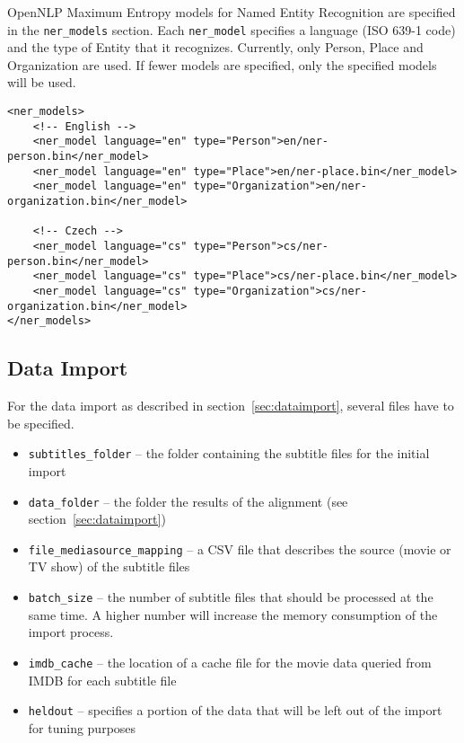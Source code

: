 OpenNLP Maximum Entropy models for Named Entity Recognition are specified in the \verb#ner_models# section. Each \verb#ner_model# specifies a language (ISO 639-1 code) and the type of Entity that it recognizes. Currently, only Person, Place and Organization are used. If fewer models are specified, only the specified models will be used.

\begin{lstlisting}
<ner_models>
    <!-- English -->
    <ner_model language="en" type="Person">en/ner-person.bin</ner_model>
    <ner_model language="en" type="Place">en/ner-place.bin</ner_model>
    <ner_model language="en" type="Organization">en/ner-organization.bin</ner_model>

    <!-- Czech -->
    <ner_model language="cs" type="Person">cs/ner-person.bin</ner_model>
    <ner_model language="cs" type="Place">cs/ner-place.bin</ner_model>
    <ner_model language="cs" type="Organization">cs/ner-organization.bin</ner_model>
</ner_models>
\end{lstlisting}

\subsection{Data Import}
For the data import as described in section~\ref{sec:dataimport}, several files have to be specified.

\begin{itemize}
        \item \verb#subtitles_folder# -- the folder containing the subtitle files for the initial import
        \item \verb#data_folder# -- the folder the results of the alignment (see section~\ref{sec:dataimport})
        \item \verb#file_mediasource_mapping# -- a CSV file that describes the source (movie or TV show) of the  subtitle files
        \item \verb#batch_size# -- the number of subtitle files that should be processed at the same time. A higher number will increase the memory consumption of the import process.
        \item \verb#imdb_cache# -- the location of a cache file for the movie data queried from IMDB for each subtitle file
        
        \item \verb#heldout# -- specifies a portion of the data that will be left out of the import for tuning purposes
\end{itemize}


